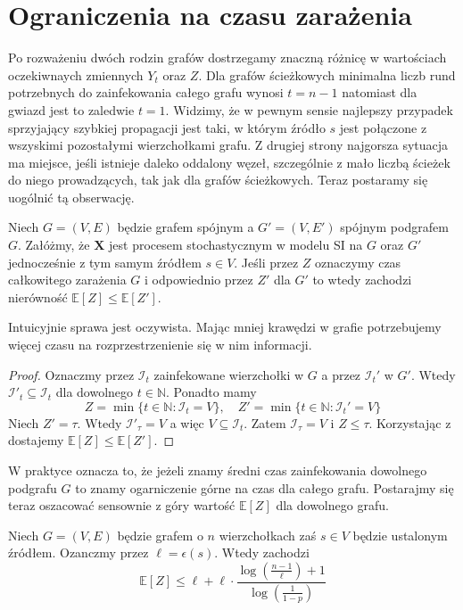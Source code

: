 \section{Ograniczenia na czasu zarażenia}
Po rozważeniu dwóch rodzin grafów dostrzegamy znaczną różnicę w wartościach oczekiwnaych zmiennych $Y_t$ oraz $Z$. Dla grafów ścieżkowych minimalna liczb rund potrzebnych do zainfekowania całego grafu wynosi $t=n-1$ natomiast dla gwiazd jest to zaledwie $t=1$. Widzimy, że w pewnym sensie najlepszy przypadek sprzyjający szybkiej propagacji jest taki, w którym źródło $s$ jest połączone z wszyskimi pozostałymi wierzchołkami grafu. Z drugiej strony najgorsza sytuacja ma miejsce, jeśli istnieje daleko oddalony węzeł, szczególnie z mało liczbą ścieżek do niego prowadzących, tak jak dla grafów ścieżkowych. Teraz postaramy się uogólnić tą obserwację. 

\begin{theorem}\label{T:montonicity_of_total_infection}
Niech $G=(V,E)$ będzie grafem spójnym a $G'=(V,E')$ spójnym podgrafem $G$. Załóżmy, że $\mathbf{X}$ jest procesem stochastycznym w modelu SI na $G$ oraz $G'$ jednocześnie z tym samym źródłem $s\in V$. Jeśli przez $Z$ oznaczymy czas całkowitego zarażenia $G$ i odpowiednio przez $Z'$ dla $G'$ to wtedy zachodzi nierówność $\mathbb{E}[Z]\le\mathbb{E}[Z']$. 
\end{theorem}

Intuicyjnie sprawa jest oczywista. Mając mniej krawędzi w grafie potrzebujemy więcej czasu na rozprzestrzenienie się w nim informacji.

\begin{proof}
Oznaczmy przez $\mathcal{I}_t$ zainfekowane wierzchołki w $G$ a przez $\mathcal{I}_t'$ w $G'$. Wtedy $\mathcal{I}'_t\subseteq\mathcal{I}_t$ dla dowolnego $t\in\mathbb{N}$. Ponadto mamy
\[
    Z = \min\{t\in\mathbb{N} : \mathcal{I}_t=V\},  \quad Z' = \min\{t\in\mathbb{N} : \mathcal{I}_t'=V\}
\]
Niech $Z' = \tau$. Wtedy $\mathcal{I}'_\tau =V$ a więc $V\subseteq \mathcal{I}_t$. Zatem $\mathcal{I}_\tau = V$ i $Z\le \tau$. Korzystając z  dostajemy $\mathbb{E}[Z]\le\mathbb{E}[Z']$.
\end{proof}

W praktyce oznacza to, że jeżeli znamy średni czas zainfekowania dowolnego podgrafu $G$ to znamy ogarniczenie górne na czas dla całego grafu. Postarajmy się teraz oszacować sensownie z góry  wartość $\mathbb{E}[Z]$ dla dowolnego grafu.

\begin{theorem}\label{T:upper_bound_on_EZ}
Niech $G=(V,E)$ będzie grafem o $n$ wierzchołkach zaś $s\in V$ będzie ustalonym źródłem. Ozanczmy przez $\ell = \epsilon(s)$. Wtedy zachodzi
\[
    \mathbb{E}[Z] \le \ell  + \ell \cdot \frac{\log(\frac{n-1}{\ell}) + 1}{\log(\frac{1}{1-p})}
\]
\end{theorem}

